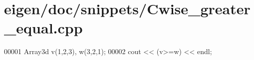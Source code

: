 \hypertarget{eigen_2doc_2snippets_2_cwise__greater__equal_8cpp_source}{}\section{eigen/doc/snippets/\+Cwise\+\_\+greater\+\_\+equal.cpp}
\label{eigen_2doc_2snippets_2_cwise__greater__equal_8cpp_source}

\begin{DoxyCode}
00001 Array3d v(1,2,3), w(3,2,1);
00002 cout << (v>=w) << endl;
\end{DoxyCode}
